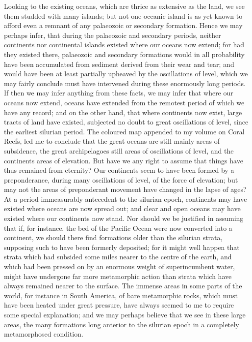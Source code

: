 \indent Looking to the existing oceans, which are thrice as extensive as the land, we see them studded with many islands; but not one oceanic island is as yet known to afford even a remnant of any palaeozoic or secondary formation. Hence we may perhaps infer, that during the palaeozoic and secondary periods, neither continents nor continental islands existed where our oceans now extend; for had they existed there, palaeozoic and secondary formations would in all probability have been accumulated from sediment derived from their wear and tear; and would have been at least partially upheaved by the oscillations of level, which we may fairly conclude must have intervened during these enormously long periods. If then we may infer anything from these facts, we may infer that where our oceans now extend, oceans have extended from the remotest period of which we have any record; and on the other hand, that where continents now exist, large tracts of land have existed, subjected no doubt to great oscillations of level, since the earliest silurian period.  The coloured map appended to my volume on Coral Reefs, led me to conclude that the great oceans are still mainly areas of subsidence, the great archipelagoes still areas of oscillations of level, and the continents areas of elevation. But have we any right to assume that things have thus remained from eternity? Our continents seem to have been formed by a preponderance, during many oscillations of level, of the force of elevation; but may not the areas of preponderant movement have changed in the lapse of ages? At a period immeasurably antecedent to the silurian epoch, continents may have existed where oceans are now spread out; and clear and open oceans may have existed where our continents now stand. Nor should we be justified in assuming that if, for instance, the bed of the Pacific Ocean were now converted into a continent, we should there find formations older than the silurian strata, supposing such to have been formerly deposited; for it might well happen that strata which had subsided some miles nearer to the centre of the earth, and which had been pressed on by an enormous weight of superincumbent water, might have undergone far more metamorphic action than strata which have always remained nearer to the surface. The immense areas in some parts of the world, for instance in South America, of bare metamorphic rocks, which must have been heated under great pressure, have always seemed to me to require some special explanation; and we may perhaps believe that we see in these large areas, the many formations long anterior to the silurian epoch in a completely metamorphosed condition.\\
